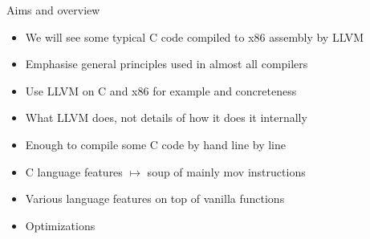 \documentclass[landscape]{beamer}
\begin{document}
\begin{frame}{Aims and overview}

\begin{itemize}
\item
We will see some typical C code compiled to x86 assembly by LLVM
\item Emphasise general principles used in almost all compilers
\item Use LLVM on C and x86 for example and concreteness
\item
\alert{What} LLVM does, not details of \alert{how} it does it internally
\item
Enough to compile some C code by hand line by line
\item
C language features $\mapsto$ soup of mainly mov instructions
\item
Various language features on top of vanilla functions
\item
Optimizations

\end{itemize}

\end{frame}
\end{document}
